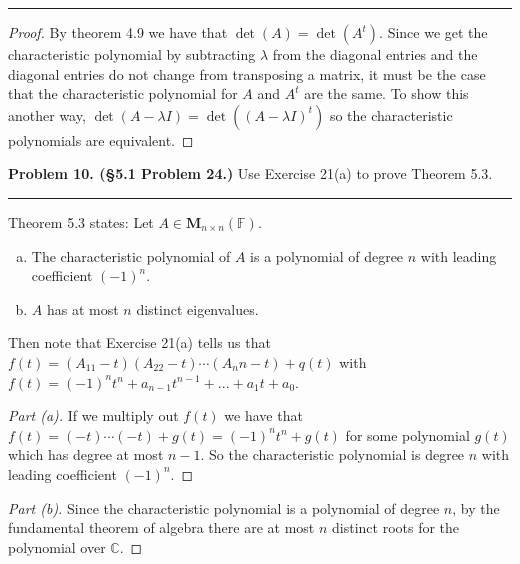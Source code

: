 \documentclass[leqno]{article}
\theoremstyle{nonumberplain}
\newtheorem{proof}{Proof}
\begin{document}
\noindent\rule[0.5ex]{\linewidth}{1pt}

\begin{proof}
By theorem 4.9 we have that $\det(A)=\det(A^t)$. Since we get the characteristic polynomial by subtracting $\lambda$ from the diagonal entries and the diagonal entries do not change from transposing a matrix, it must be the case that the characteristic polynomial for $A$ and $A^t$ are the same. To show this another way, $\det(A-\lambda I)=\det((A-\lambda I)^t)$ so the characteristic polynomials are equivalent.
\end{proof}

\pagebreak



\noindent\textbf{Problem 10. (\S 5.1 Problem 24.)} Use Exercise 21(a) to prove Theorem 5.3.

\noindent\rule[0.5ex]{\linewidth}{1pt}

Theorem 5.3 states: Let $A\in \mathbf{M}_{n\times n} (\mathbb{F})$.
\begin{enumerate}[(a)]
\item The characteristic polynomial of $A$ is a polynomial of degree $n$ with leading coefficient $(-1)^n$.
\item $A$ has at most $n$ distinct eigenvalues.
\end{enumerate}
Then note that Exercise 21(a) tells us that $f(t)=(A_{11}-t)(A_{22}-t)\cdots (A_nn-t)+q(t)$ with $f(t)=(-1)^n t^n +a_{n-1}t^{n-1}+...+a_1t+a_0$. 

\begin{proof}[Part (a)]
If we multiply out $f(t)$ we have that $f(t)=(-t)\cdots(-t) + g(t)=(-1)^n t^n +g(t)$ for some polynomial $g(t)$ which has degree at most $n-1$.  So the characteristic polynomial is degree $n$ with leading coefficient $(-1)^n$.
\end{proof}

\begin{proof}[Part (b)]
Since the characteristic polynomial is a polynomial of degree $n$, by the fundamental theorem of algebra there are at most $n$ distinct roots for the polynomial over $\mathbb{C}$.
\end{proof}

\pagebreak
\end{document}
